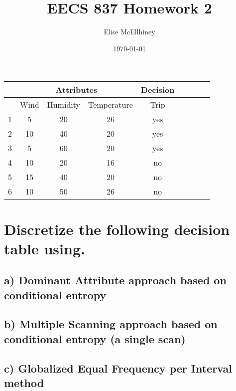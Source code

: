 \documentclass[10pt]{amsart}
\title{EECS 837 Homework 2}
\author{Elise McEllhiney}
\date{\today}                                           %
\begin{document}
\maketitle

\begin{center}
\begin{tabular}{ | c | c | c | c | c | c | c | c | c |}
\hline
 & \multicolumn{3}{|c|}{Attributes} & Decision \\
 \hline
 & Wind & Humidity & Temperature & Trip \\
 \hline
 1 & 5 & 20 & 26 & yes\\ 
 2 & 10 & 40 & 20 & yes\\  
 3 & 5 & 60 & 20 & yes\\  
 4 & 10 & 20 & 16 & no\\ 
 5 & 15 & 40 & 20 & no\\ 
 6 & 10 & 50 & 26 & no\\ 
 \hline 
\end{tabular}
\end{center}

\section{Discretize the following decision table using.}
\subsection{a) Dominant Attribute approach based on conditional entropy}
\subsection{b) Multiple Scanning approach based on conditional entropy (a single scan)}
\subsection{c) Globalized Equal Frequency per Interval method}
\end{document}
